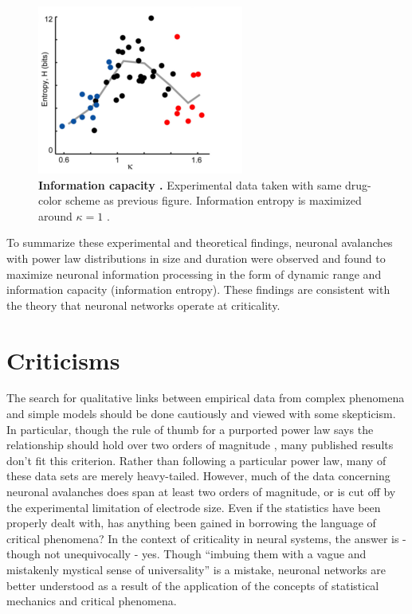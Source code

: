 \documentclass[12pt]{article}
\begin{document}
\begin{figure}      
  \begin{center}    
 \includegraphics[width=.50\textwidth]{entropyplenz}    
    \caption{\textbf{Information capacity \cite{Shew2011a}.} Experimental data taken with same drug-color scheme as previous figure. Information entropy is maximized around $\kappa = 1$ .}
   \label{Figure::Entropy / information maximized experimental}   
  \end{center}     
   \end{figure}

To summarize these experimental and theoretical findings, neuronal avalanches with power law distributions in size and duration were observed and found to maximize neuronal information processing in the form of dynamic range and information capacity (information entropy). These findings are consistent with the theory that neuronal networks operate at criticality. 



\section*{Criticisms} The search for qualitative links between empirical data from complex phenomena and simple models should be done cautiously and viewed with some skepticism. In particular, though the rule of thumb for a purported power law says the relationship should hold over two orders of magnitude \cite{Sethna2011a}, many published results don't fit this criterion. Rather than following a particular power law, many of these data sets are merely heavy-tailed. However, much of the data concerning neuronal avalanches does span at least two orders of magnitude, or is cut off by the experimental limitation of electrode size. Even if the statistics have been properly dealt with, has anything been gained in borrowing the language of critical phenomena? In the context of criticality in neural systems, the answer is - though not unequivocally - yes. Though ``imbuing them with a vague and mistakenly mystical sense of universality'' \cite{Stumpf2012a} is a mistake, neuronal networks are better understood as a result of the application of the concepts of statistical mechanics and critical phenomena. 
\end{document}
